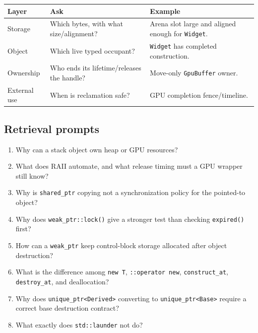 {\def\LTcaptype{none} %
\begin{longtable}[]{@{}
  >{\raggedright\arraybackslash}p{}
  >{\raggedright\arraybackslash}p{}
  >{\raggedright\arraybackslash}p{}@{}}
\toprule\noalign{}
\begin{minipage}[b]{\linewidth}\raggedright
Layer
\end{minipage} & \begin{minipage}[b]{\linewidth}\raggedright
Ask
\end{minipage} & \begin{minipage}[b]{\linewidth}\raggedright
Example
\end{minipage} \\
\midrule\noalign{}
\endhead
\bottomrule\noalign{}
\endlastfoot
Storage & Which bytes, with what size/alignment? & Arena slot large and aligned enough for \texttt{Widget}. \\
Object & Which live typed occupant? & \texttt{Widget} has completed construction. \\
Ownership & Who ends its lifetime/releases the handle? & Move-only \texttt{GpuBuffer} owner. \\
External use & When is reclamation safe? & GPU completion fence/timeline. \\
\end{longtable}
}

\subsection{Retrieval prompts}\label{retrieval-prompts}

\begin{enumerate}
\def\labelenumi{\arabic{enumi}.}
\tightlist
\item
  Why can a stack object own heap or GPU resources?
\item
  What does RAII automate, and what release timing must a GPU wrapper still know?
\item
  Why is \texttt{shared\_ptr} copying not a synchronization policy for the pointed-to object?
\item
  Why does \texttt{weak\_ptr::lock()} give a stronger test than checking \texttt{expired()} first?
\item
  How can a \texttt{weak\_ptr} keep control-block storage allocated after object destruction?
\item
  What is the difference among \texttt{new\ T}, \texttt{::operator\ new}, \texttt{construct\_at}, \texttt{destroy\_at}, and deallocation?
\item
  Why does \texttt{unique\_ptr\textless{}Derived\textgreater{}} converting to \texttt{unique\_ptr\textless{}Base\textgreater{}} require a correct base destruction contract?
\item
  What exactly does \texttt{std::launder} not do?
\end{enumerate}

